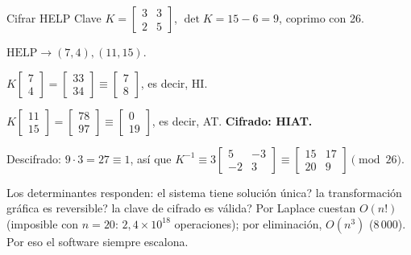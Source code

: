 \begin{tmejemplo}{Cifrar HELP}
Clave $K=\begin{bmatrix}3&3\\2&5\end{bmatrix}$, $\det K=15-6=9$, coprimo con 26.
\begin{tmpasos}
\item $\text{HELP}\to(7, 4),(11, 15)$.
\item $K\begin{bmatrix}7\\4\end{bmatrix}=\begin{bmatrix}33\\34\end{bmatrix}\equiv\begin{bmatrix}7\\8\end{bmatrix}$, es decir, HI.
\item $K\begin{bmatrix}11\\15\end{bmatrix}=\begin{bmatrix}78\\97\end{bmatrix}\equiv\begin{bmatrix}0\\19\end{bmatrix}$, es decir, AT. \textbf{Cifrado: HIAT.}
\item Descifrado: $9\cdot3=27\equiv1$, as\'i que $K^{-1}\equiv3\begin{bmatrix}5&-3\\-2&3\end{bmatrix}\equiv\begin{bmatrix}15&17\\20&9\end{bmatrix}\pmod{26}$.
\end{tmpasos}
\end{tmejemplo}

\begin{tmsistemas}
Los determinantes responden: \textquestiondown el sistema tiene soluci\'on \'unica? \textquestiondown la transformaci\'on gr\'afica es reversible? \textquestiondown la clave de cifrado es v\'alida? Por Laplace cuestan $O(n!)$ (imposible con $n=20$: $2{,}4\times10^{18}$ operaciones); por eliminaci\'on, $O(n^3)$ ($8\,000$). Por eso el software siempre escalona.
\end{tmsistemas}

